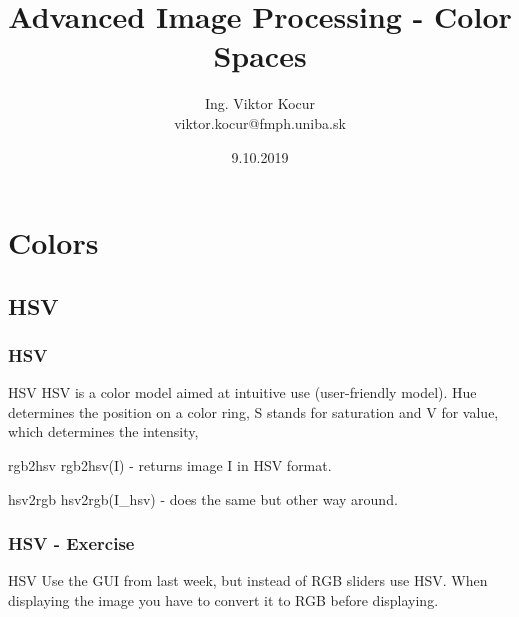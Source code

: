 \documentclass{beamer}
\title[3. cvičenie]{Advanced Image Processing - Color Spaces}
\author[Kocur]{Ing. Viktor Kocur \\{\small viktor.kocur@fmph.uniba.sk}}
\institute{DAI FMFI UK}
\date{9.10.2019}
\begin{document}

\begin{frame}
  \titlepage
\end{frame}


\section{Colors}
\subsection{HSV}
\begin{frame}
\frametitle{HSV}
  \begin{block}{HSV}
  HSV is a color model aimed at intuitive use (user-friendly model). Hue determines the position on a color ring, S stands for saturation and V for value, which determines the intensity,
  
  \end{block} 
  
  \begin{block}{rgb2hsv}
  rgb2hsv(I) - returns image I in HSV format.
  \end{block} 
  
    \begin{block}{hsv2rgb}
  hsv2rgb(I\_hsv) - does the same but other way around.
  \end{block} 
\end{frame}

\begin{frame}
\frametitle{HSV - Exercise}
  \begin{block}{HSV}
  Use the GUI from last week, but instead of RGB sliders use HSV. When displaying the image you have to convert it to RGB before displaying.
  \end{block} 

\end{frame}
\end{document}
